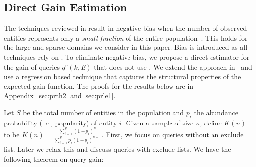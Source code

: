 \subsection{Direct Gain Estimation}
\label{sec:newestim}
The techniques reviewed in  result in negative bias when the number of observed entities represents only a {\em small fraction} of the entire population~\cite{hwang:2010, shen:2003}. This holds for the large and sparse domains we consider in this paper. Bias is introduced as all techniques rely on . To eliminate negative bias, we propose a direct estimator for the gain of queries $q^v(k,E)$ that does not use . We extend the approach in~\cite{hwang:2010} and use a regression based technique that captures the structural properties of the expected gain function. The proofs for the results below are in Appendix~\ref{sec:prth2} and \ref{sec:prle1}.

Let $S$ be the total number of entities in the population and $p_i$ the abundance probability (i.e., popularity) of entity $i$. Given a sample of size $n$, define $K(n)$ to be $K(n) = \frac{\sum_{i=1}^S (1-p_i)^n}{\sum_{i=1}^S p_i(1-p_i)^{n-1}}$. First, we focus on queries without an exclude list. Later we relax this and discuss queries with exclude lists. We have the following theorem on query gain:

